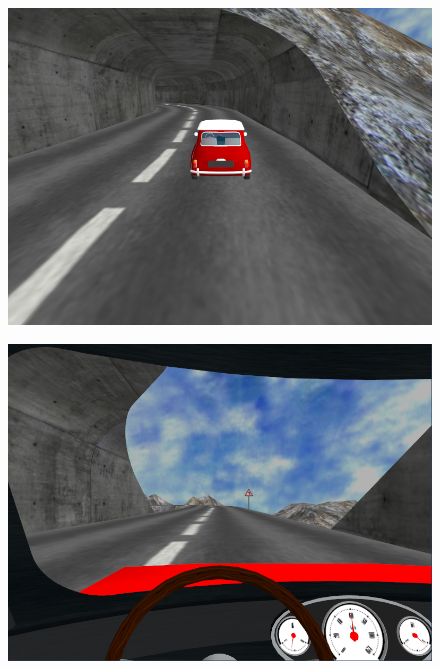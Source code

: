 \begin{figure}[H]
\flushleft 
\includegraphics[width=0.9\linewidth]{src/screenshot3.png}
\end{figure}

\begin{figure}[H]
\flushleft 
\includegraphics[width=0.9\linewidth]{src/screenshot4.png}
\end{figure}



